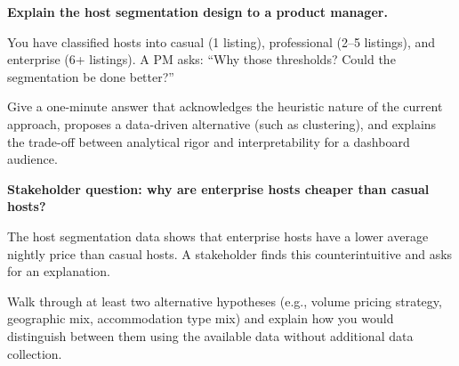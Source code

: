 \begin{interviewbox}
  \textbf{Explain the host segmentation design to a product manager.}

  You have classified hosts into casual (1 listing), professional (2--5 listings),
  and enterprise (6+ listings). A PM asks: ``Why those thresholds? Could the
  segmentation be done better?''

  Give a one-minute answer that acknowledges the heuristic nature of the current
  approach, proposes a data-driven alternative (such as clustering), and explains
  the trade-off between analytical rigor and interpretability for a dashboard
  audience.
\end{interviewbox}

\begin{interviewbox}
  \textbf{Stakeholder question: why are enterprise hosts cheaper than casual hosts?}

  The host segmentation data shows that enterprise hosts have a lower average
  nightly price than casual hosts. A stakeholder finds this counterintuitive and
  asks for an explanation.

  Walk through at least two alternative hypotheses (e.g., volume pricing strategy,
  geographic mix, accommodation type mix) and explain how you would distinguish
  between them using the available data without additional data collection.
\end{interviewbox}
